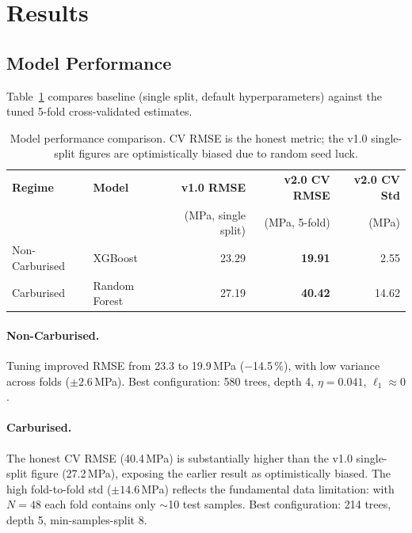 \documentclass[12pt,a4paper]{article}
\begin{document}
\section{Results}

\subsection{Model Performance}

Table~\ref{tab:perf} compares baseline (single split, default hyperparameters) against the tuned
5-fold cross-validated estimates.

\begin{table}[H]
  \centering
  \caption{Model performance comparison. CV RMSE is the honest metric; the v1.0 single-split
           figures are optimistically biased due to random seed luck.}
  \label{tab:perf}
  \begin{tabular}{llrrr}
    \toprule
    \textbf{Regime} & \textbf{Model} & \textbf{v1.0 RMSE} & \textbf{v2.0 CV RMSE} & \textbf{v2.0 CV Std} \\
    & & (MPa, single split) & (MPa, 5-fold) & (MPa) \\
    \midrule
    Non-Carburised & XGBoost       & 23.29 & \textbf{19.91} & 2.55 \\
    Carburised     & Random Forest & 27.19 & \textbf{40.42} & 14.62 \\
    \bottomrule
  \end{tabular}
\end{table}

\paragraph{Non-Carburised.} Tuning improved RMSE from 23.3 to 19.9\,MPa ($-$14.5\,\%), with low
variance across folds ($\pm 2.6$\,MPa). Best configuration: 580 trees, depth 4,
$\eta=0.041$, $\ell_1 \approx 0$.

\paragraph{Carburised.} The honest CV RMSE (40.4\,MPa) is substantially higher than the v1.0
single-split figure (27.2\,MPa), exposing the earlier result as optimistically biased. The high
fold-to-fold std ($\pm 14.6$\,MPa) reflects the fundamental data limitation: with $N=48$ each
fold contains only $\sim$10 test samples. Best configuration: 214 trees, depth 5,
min-samples-split 8.
\end{document}
